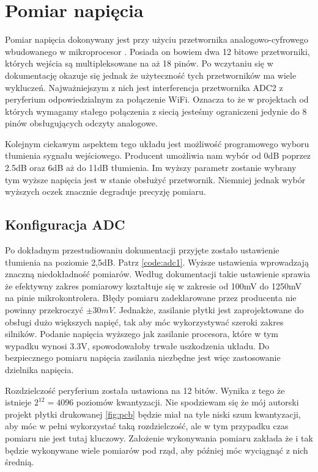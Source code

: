     \section{Pomiar napięcia}
         Pomiar napięcia dokonywany jest przy użyciu przetwornika analogowo-cyfrowego wbudowanego w mikroprocesor \cite{esp32}. Posiada on bowiem dwa 12 bitowe przetworniki, których wejścia są multipleksowane na aż 18 pinów. Po wczytaniu się w dokumentację okazuje się jednak że użyteczność tych przetworników ma wiele wykluczeń. Najważniejszym z nich jest interferencja przetwornika ADC2 z peryferium odpowiedzialnym za połączenie WiFi. Oznacza to że w projektach od których wymagamy stałego połączenia z siecią jesteśmy ograniczeni jedynie do 8 pinów obsługujących odczyty analogowe. 
         
         Kolejnym ciekawym aspektem tego układu jest możliwość programowego wyboru tłumienia sygnału wejściowego. Producent umożliwia nam wybór od 0dB poprzez 2.5dB oraz 6dB aż do 11dB tłumienia. Im wyższy parametr zostanie wybrany tym wyższe napięcia jest w stanie obsłużyć przetwornik. Niemniej jednak wybór wyższych oczek znacznie degraduje precyzję pomiaru.
     
     
    \subsection{Konfiguracja ADC}
        Po dokładnym przestudiowaniu dokumentacji przyjęte zostało ustawienie tłumienia na poziomie 2,5dB. Patrz \ref{code:adc1}. Wyższe ustawienia wprowadzają znaczną niedokładność pomiarów. Według dokumentacji \cite{esp32} takie ustawienie sprawia że efektywny zakres pomiarowy kształtuje się w zakresie od 100mV do 1250mV na pinie mikrokontrolera. Błędy pomiaru zadeklarowane przez producenta nie powinny przekroczyć $ \pm 30 mV$. Jednakże, zasilanie płytki jest zaprojektowane do obsługi dużo większych napięć, tak aby móc wykorzystywać szeroki zakres silników. Podanie napięcia wyższego jak zasilanie procesora, które w tym wypadku wynosi 3.3V, spowodowałoby trwałe uszkodzenia układu. Do bezpiecznego pomiaru napięcia zasilania niezbędne jest więc zastosowanie dzielnika napięcia. 
        
        Rozdzielczość peryferium została ustawiona na 12 bitów. Wynika z tego że istnieje $2^{12} = 4096$ poziomów kwantyzacji. Nie spodziewam się że mój autorski projekt płytki drukowanej \ref{fig:pcb} będzie miał na tyle niski szum kwantyzacji, aby móc w pełni wykorzystać taką rozdzielczość, ale w tym przypadku czas pomiaru nie jest tutaj kluczowy. Założenie wykonywania pomiaru zakłada że i tak będzie wykonywane wiele pomiarów pod rząd, aby później móc wyciągnąć z nich średnią.
        
